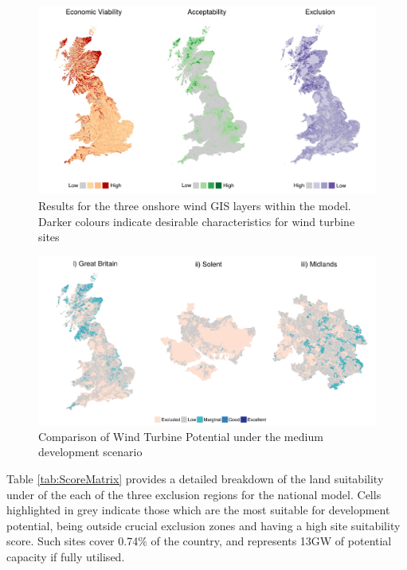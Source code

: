 \documentclass[a4paper,]{article}
\theoremstyle{definition}
\theoremstyle{definition}
\theoremstyle{remark}
\begin{document}
{\begin{figure}[!h]
\includegraphics[width=1\linewidth]{figures/GISLayers} \caption{Results for the three onshore wind GIS layers within the model. Darker colours indicate desirable characteristics for wind turbine sites}\label{fig:GISLayers}
\end{figure}

\begin{figure}[!h]
\includegraphics[width=1\linewidth]{figures/ResultsMap} \caption{Comparison of Wind Turbine Potential under the medium development scenario}\label{fig:ResultsMap}
\end{figure}

Table \ref{tab:ScoreMatrix} provides a detailed breakdown of the land
suitability under of the each of the three exclusion regions for the
national model. Cells highlighted in grey indicate those which are the
most suitable for development potential, being outside crucial exclusion
zones and having a high site suitability score. Such sites cover 0.74\%
of the country, and represents 13GW of potential capacity if fully
utilised.

\begin{table}


\end{table}}
\end{document}
